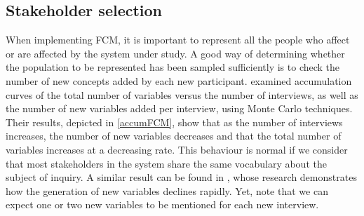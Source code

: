 \subsection{Stakeholder selection}

When implementing FCM, it is important to represent all the people who affect or are affected by the system under study. A good way of determining whether the population to be represented has been sampled sufficiently is to check the number of new concepts added by each new participant. \cite{ozesmi2004ecological} examined accumulation curves of the total number of variables versus the number of interviews, as well as the number of new variables added per interview, using Monte Carlo techniques. Their results, depicted in \cref{accumFCM}, show that as the number of interviews increases, the number of new variables decreases and that the total number of variables increases at a decreasing rate. This behaviour is normal if we consider that most stakeholders in the system share the same vocabulary about the subject of inquiry. A similar result can be found in \cite{morone2021using}, whose research demonstrates how the generation of new variables declines rapidly. Yet, \cite{ozesmi2004ecological} note that we can expect one or two new variables to be mentioned for each new interview. 

